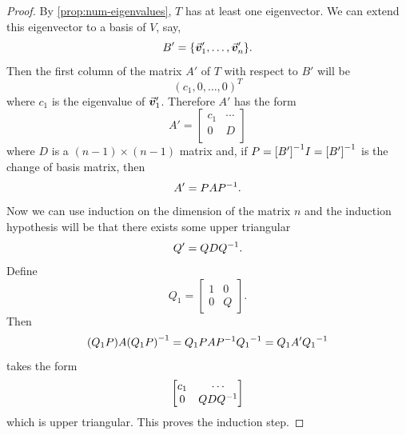 \documentclass[MathsNotesBase.tex]{subfiles}
\begin{document}
{		\bigskip
		\begin{proof}
			By \autoref{prop:num-eigenvalues}, $T$ has at least one eigenvector. We can extend this eigenvector to a basis of $V$, say,
			\[ B' = \{\vec{\bm{v}}_1',\dots,\vec{\bm{v}}_n'\}. \]
			Then the first column of the matrix $A'$ of $T$ with respect to $B'$ will be
			\[ (c_1,0,\dots,0)^T \]
			where $c_1$ is the eigenvalue of $\vec{\bm{v}}_1'$. Therefore $A'$ has the form
			\[
				A' = \begin{bmatrix}
					c_1 & \cdots \\
					0   &   D \\
					\end{bmatrix} 
			\]
			where $D$ is a ${ (n-1) \times (n-1) }$ matrix and, if ${ P = {[B']}^{-1}I = {[B']}^{-1} }$ is the change of basis matrix, then
			\[ A' = PA{P}^{-1}. \]
			Now we can use induction on the dimension of the matrix $n$ and the induction hypothesis will be that there exists some upper triangular
			\[ Q' = QD{Q}^{-1}. \]
			Define
			\[ Q_1 = \begin{bmatrix}
					1 & 0\\
					0 & Q
					\end{bmatrix}. 
			\]
			Then
			\[ (Q_1P)A{(Q_1P)}^{-1} = Q_1PA{P}^{-1}{Q_1}^{-1} = Q_1A'{Q_1}^{-1} \]
			takes the form
			\[
				\begin{bmatrix}
				c_1 & \cdots\\
				0   & QD{Q}^{-1}
				\end{bmatrix} 
			\]
			which is upper triangular. This proves the induction step.
		\end{proof}
	
		\medskip{}
		
}
\end{document}
